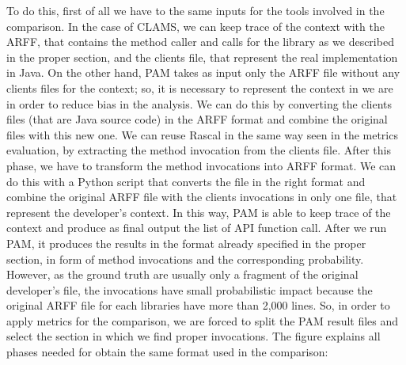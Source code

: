 To do this, first of all we have to the same inputs for the tools involved in the comparison. In the case of CLAMS, we can keep trace of the context with the ARFF, that contains the method caller and calls for the library as we described in the proper section, and the clients file, that represent the real implementation in Java. On the other hand, PAM takes as input only the ARFF file without any clients files for the context; so, it is necessary to represent the context in we are in order to reduce bias in the analysis. We can do this by converting the clients files (that are Java source code) in the ARFF format and combine the original files with this new one. We can reuse Rascal in the same way seen in the metrics evaluation, by extracting the method invocation from the clients file. After this phase, we have to transform the method invocations into ARFF format. We can do this with a Python script that converts the file in the right format and combine the original ARFF file with the clients invocations in only one file, that represent the developer's context. In this way, PAM is able to keep trace of the context and produce as final output the list of API function call. After we run PAM, it produces the results in the format already specified in the proper section, in form of method invocations and the corresponding probability. However, as the ground truth are usually only a fragment of the original developer's file, the invocations have small probabilistic impact because the original ARFF file for each libraries have more than 2,000 lines. So, in order to apply metrics for the comparison, we are forced to split the PAM result files and select the section in which we find proper invocations. The figure explains all phases needed for obtain the same format used in the comparison:
 

